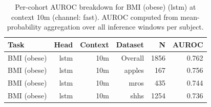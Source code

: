 \begin{table}[ht]
\centering
\caption{Per-cohort AUROC breakdown for BMI (obese) (lstm) at context 10m (channel: fast). AUROC computed from mean-probability aggregation over all inference windows per subject.}
\label{tab:cohort_bmi_binary_lstm_fast}
\begin{tabular}{lrrrrr}
\toprule
Task & Head & Context & Dataset & N & AUROC \\
\midrule
BMI (obese) & lstm & 10m & Overall & 1856 & 0.762 \\
BMI (obese) & lstm & 10m & apples & 167 & 0.756 \\
BMI (obese) & lstm & 10m & mros & 435 & 0.744 \\
BMI (obese) & lstm & 10m & shhs & 1254 & 0.736 \\
\bottomrule
\end{tabular}
\end{table}